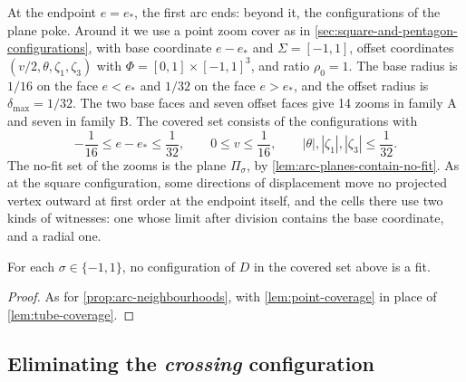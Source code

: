 At the endpoint $e=e_*$, the first arc ends: beyond it, the configurations
of the plane poke. Around it we use a point zoom cover as in
\cref{sec:square-and-pentagon-configurations}, with base coordinate
$e-e_*$ and $\Sigma=[-1,1]$, offset coordinates $(v/2,\theta,\zeta_1,\zeta_3)$
with $\Phi=[0,1]\times{[-1,1]}^3$, and ratio $\rho_0=1$. The base radius is
$1/16$ on the face $e<e_*$ and $1/32$ on the face $e>e_*$, and the offset
radius is $\delta_{\max}=1/32$. The two base faces and seven offset faces
give 14 zooms in family A and seven in family B. The covered set consists
of the configurations with
\[
  -\frac1{16}\le e-e_*\le\frac1{32},\qquad 0\le v\le\frac1{16},\qquad
  |\theta|,|\zeta_1|,|\zeta_3|\le\frac1{32}.
\]
The no-fit set of the zooms is the plane $\Pi_\sigma$, by
\cref{lem:arc-planes-contain-no-fit}.
As at the square configuration, some directions of displacement move no
projected vertex outward at first order at the endpoint itself, and the
cells there use two kinds of witnesses: one whose limit after division
contains the base coordinate, and a radial one.

\begin{proposition}\label{prop:endpoint-neighbourhoods}
  For each $\sigma\in\{-1,1\}$, no configuration of $D$ in the covered set
  above is a fit.
\end{proposition}
\begin{proof}
  As for \cref{prop:arc-neighbourhoods}, with \cref{lem:point-coverage}
  in place of \cref{lem:tube-coverage}.
\end{proof}

\subsection{Eliminating the \emph{crossing} configuration}\label{subsec:eliminating-the-crossing-configuration}

